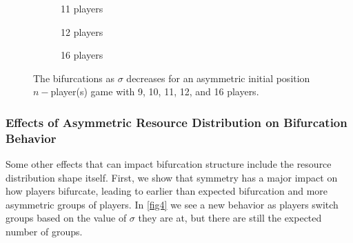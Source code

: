 \documentclass{article}
\begin{document}
\begin{figure}[ht!]
                    
                    \begin{subfigure}[b]{0.3\linewidth}
                        \centering
                         
                        \caption{11 players }  
                        \label{fig3:e} 
                        \vspace{4ex}
                    \end{subfigure}
                    \begin{subfigure}[b]{0.3\linewidth}
                        \centering
                         
                        \caption{12 players} 
                        \label{fig3:f} 
                        \vspace{4ex}
                    \end{subfigure}
                    \begin{subfigure}[b]{0.3\linewidth}
                        \centering
                         
                        \caption{16 players } 
                        \label{fig3:g}
                        \vspace{4ex}
                    \end{subfigure} 
                    \caption{The bifurcations as $\sigma$ decreases for an asymmetric initial position $n-$player(s) game with 9, 10, 11, 12, and 16 players.}
                    \label{fig3} 
                \end{figure}
                \clearpage
                
                
                    
                
            \subsubsection{Effects of Asymmetric Resource Distribution on Bifurcation Behavior}
                Some other effects that can impact bifurcation structure include the resource distribution shape itself. First, we show that symmetry has a major impact on how players bifurcate, leading to earlier than expected bifurcation and more asymmetric groups of players. In \cref{fig4} we see a new behavior as players switch groups based on the value of $\sigma$ they are at, but there are still the expected number of groups.
                
\end{document}
